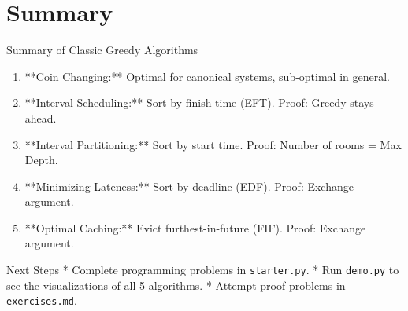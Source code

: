 \documentclass[aspectratio=169,xcolor=dvipsnames]{beamer}
\begin{document}
\section{Summary}

\begin{frame}{Summary of Classic Greedy Algorithms}
  \begin{enumerate}
    \item **Coin Changing:** Optimal for canonical systems, sub-optimal in general.
    \item **Interval Scheduling:** Sort by finish time (EFT). Proof: Greedy stays ahead.
    \item **Interval Partitioning:** Sort by start time. Proof: Number of rooms = Max Depth.
    \item **Minimizing Lateness:** Sort by deadline (EDF). Proof: Exchange argument.
    \item **Optimal Caching:** Evict furthest-in-future (FIF). Proof: Exchange argument.
  \end{enumerate}
  \begin{block}{Next Steps}
    * Complete programming problems in \texttt{starter.py}.
    * Run \texttt{demo.py} to see the visualizations of all 5 algorithms.
    * Attempt proof problems in \texttt{exercises.md}.
  \end{block}
\end{frame}
\end{document}
